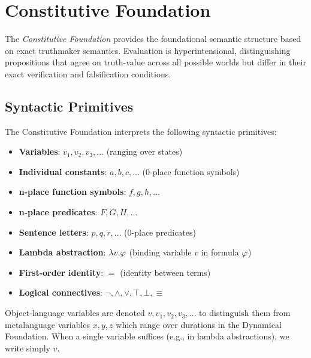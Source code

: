 \documentclass[../LogosReference.tex]{subfiles}
\begin{document}

\section{Constitutive Foundation}\label{sec:constitutive-foundation}

The \textit{Constitutive Foundation} provides the foundational semantic structure based on exact truthmaker semantics.
Evaluation is hyperintensional, distinguishing propositions that agree on truth-value across all possible worlds but differ in their exact verification and falsification conditions.


\subsection{Syntactic Primitives}\label{sec:syntactic-primitives}

The Constitutive Foundation interprets the following syntactic primitives:


\begin{itemize}
	\item \textbf{Variables}: $v_1, v_2, v_3, \ldots$ (ranging over states)
	\item \textbf{Individual constants}: $a, b, c, \ldots$ (0-place function symbols)
	\item \textbf{n-place function symbols}: $f, g, h, \ldots$
	\item \textbf{n-place predicates}: $F, G, H, \ldots$
	\item \textbf{Sentence letters}: $p, q, r, \ldots$ (0-place predicates)
	\item \textbf{Lambda abstraction}: $\lambda v.\varphi$ (binding variable $v$ in formula $\varphi$)
	\item \textbf{First-order identity}: $=$ (identity between terms)
	\item \textbf{Logical connectives}: $\neg, \land, \lor, \top, \bot, \equiv$
\end{itemize}

\begin{remark}
Object-language variables are denoted $v, v_1, v_2, v_3, \ldots$ to distinguish them from metalanguage variables $x, y, z$ which range over durations in the Dynamical Foundation.
When a single variable suffices (e.g., in lambda abstractions), we write simply $v$.
\end{remark}
\end{document}
